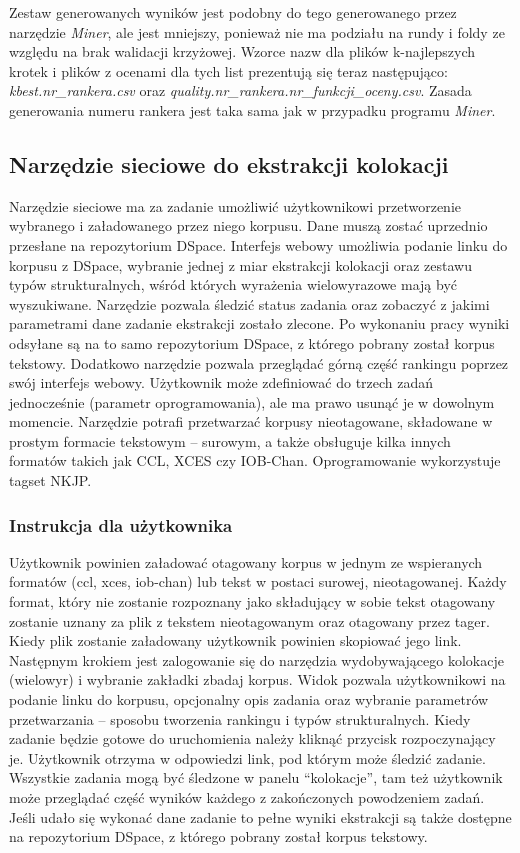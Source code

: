 \documentclass[11pt,a4paper]{llncs}
\begin{document}
Zestaw generowanych wyników jest podobny do tego generowanego przez narzędzie \emph{Miner}, ale jest mniejszy, ponieważ nie ma podziału na rundy i foldy ze względu na brak walidacji krzyżowej.
Wzorce nazw dla plików k-najlepszych krotek i plików z ocenami dla tych list prezentują się teraz następująco: \emph{kbest.nr\_rankera.csv} oraz \emph{quality.nr\_rankera.nr\_funkcji\_oceny.csv}.
Zasada generowania numeru rankera jest taka sama jak w przypadku programu \emph{Miner}.


\subsection{Narzędzie sieciowe do ekstrakcji kolokacji}
Narzędzie sieciowe ma za zadanie umożliwić użytkownikowi przetworzenie wybranego i załadowanego przez niego korpusu. 
Dane muszą zostać uprzednio przesłane na repozytorium DSpace.
Interfejs webowy umożliwia podanie linku do korpusu z DSpace, wybranie jednej z miar ekstrakcji kolokacji oraz zestawu typów strukturalnych, wśród których wyrażenia wielowyrazowe mają być wyszukiwane.
Narzędzie pozwala śledzić status zadania oraz zobaczyć z jakimi parametrami dane zadanie ekstrakcji zostało zlecone.
Po wykonaniu pracy wyniki odsyłane są na to samo repozytorium DSpace, z którego pobrany został korpus tekstowy.
Dodatkowo narzędzie pozwala przeglądać górną część rankingu poprzez swój interfejs webowy.
Użytkownik może zdefiniować do trzech zadań jednocześnie (parametr oprogramowania), ale ma prawo usunąć je w dowolnym momencie.
Narzędzie potrafi przetwarzać korpusy nieotagowane, składowane w prostym formacie tekstowym -- surowym, a także obsługuje kilka innych formatów takich jak CCL, XCES czy IOB-Chan.
Oprogramowanie wykorzystuje tagset NKJP.

\subsubsection{Instrukcja dla użytkownika}
Użytkownik powinien załadować otagowany korpus w jednym ze wspieranych formatów (ccl, xces, iob-chan) lub tekst w postaci surowej, nieotagowanej. 
Każdy format, który nie zostanie rozpoznany jako składujący w sobie tekst otagowany zostanie uznany za plik z tekstem nieotagowanym oraz otagowany przez tager.
Kiedy plik zostanie załadowany użytkownik powinien skopiować jego link.
Następnym krokiem jest zalogowanie się do narzędzia wydobywającego kolokacje (wielowyr) i wybranie zakładki zbadaj korpus.
Widok pozwala użytkownikowi na podanie linku do korpusu, opcjonalny opis zadania oraz wybranie parametrów przetwarzania -- sposobu tworzenia rankingu i typów strukturalnych.
Kiedy zadanie będzie gotowe do uruchomienia należy kliknąć przycisk rozpoczynający je.
Użytkownik otrzyma w odpowiedzi link, pod którym może śledzić zadanie.
Wszystkie zadania mogą być śledzone w panelu ``kolokacje'', tam też użytkownik może przeglądać część wyników każdego z zakończonych powodzeniem zadań.
Jeśli udało się wykonać dane zadanie to pełne wyniki ekstrakcji są także dostępne na repozytorium DSpace, z którego pobrany został korpus tekstowy.
\end{document}

